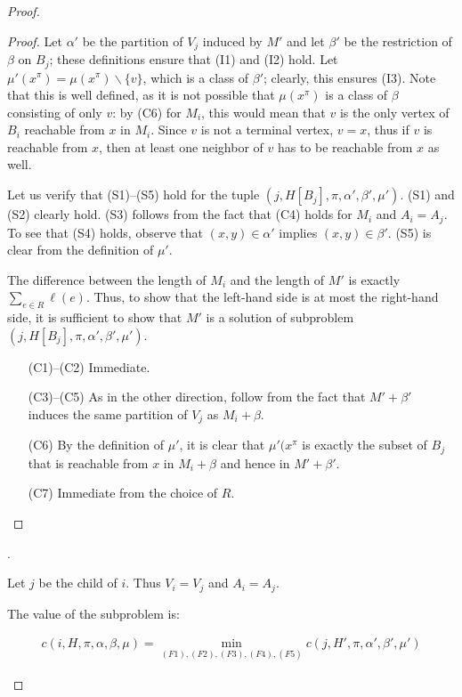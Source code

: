 \begin{proof}
\begin{proof}
Let \(\alpha'\) be the partition of \(V_j\) induced by \(M'\) and let \(\beta'\) be the restriction of \(\beta\) on \(B_j\); these definitions ensure that (I1) and (I2) hold. Let \(\mu'(x^\pi ) = \mu(x^\pi ) \backslash \{v\}\), which is a class of \(\beta'\); clearly, this ensures (I3). Note that this is well defined, as it is not possible that \(\mu(x^\pi)\) is a class of \(\beta\) consisting of only \(v\): by (C6) for \(M_i\), this would mean that \(v\) is the only vertex of \(B_i\) reachable from \(x\) in \(M_i\). Since \(v\) is not a terminal vertex, \(v = x\), thus if \(v\) is reachable from \(x\), then at least one neighbor of \(v\) has to be reachable from \(x\) as well.

Let us verify that (S1)–(S5) hold for the tuple \((j, H[B_j], \pi, \alpha', \beta', \mu')\). (S1) and (S2) clearly hold. (S3) follows from the fact that (C4) holds for \(M_i\) and \(A_i = A_j\). To see that (S4) holds, observe that \((x, y) \in \alpha'\) implies \((x, y) \in \beta'\). (S5) is clear from the definition of \(\mu'\).

The difference between the length of \(M_i\) and the length of \(M'\) is exactly \(\sum_{e \in R} \ell(e)\). Thus, to show that the left-hand side is at most the right-hand side, it is sufficient to show that \(M'\) is a solution of subproblem \((j, H[B_j], \pi, \alpha', \beta', \mu')\).

\begin{itemize}
    \item[(C1)–(C2)] Immediate.
    \item[(C3)–(C5)] As in the other direction, follow from the fact that \(M' + \beta'\) induces the same partition of \(V_j\) as \(M_i + \beta\).
    \item[(C6)] By the definition of \(\mu'\), it is clear that \(\mu'(x^\pi\) is exactly the subset of \(B_j\) that is reachable from \(x\) in \(M_i + \beta\) and hence in \(M' + \beta'\).
    \item[(C7)] Immediate from the choice of \(R\).
\end{itemize}
\end{proof}

.

\begin{claim}
Let \(j\) be the child of \(i\). Thus \(V_i = V_j\) and \(A_i = A_j\).

The value of the subproblem is:

\begin{align*}
c(i, H, \pi, \alpha, \beta, \mu) = \min_{(F1), (F2), (F3), (F4), (F5)} c(j, H', \pi, \alpha', \beta', \mu')
\end{align*}


\end{claim}
\end{proof}
